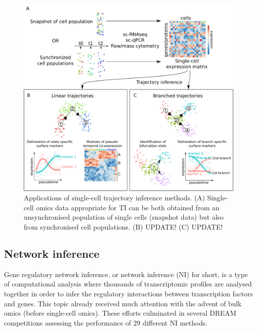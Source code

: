 \begin{figure}[htb!]
	\centering\includegraphics[width=\Largefigure]{fig/trajectory_inference_slim} %
	\caption{
		Applications of single-cell trajectory inference methods. (A) Single-cell omics data appropriate for TI can be both obtained from an unsynchronised population of single cells (snapshot data) but also from synchronised cell populations. (B) UPDATE! (C) UPDATE!
	}
	\label{fig:trajectory_inference}
\end{figure}


\subsection{Network inference}
Gene regulatory network inference, or network inference (NI) for short, is a type of computational analysis where thousands of transcriptomic profiles are analysed together in order to infer the regulatory interactions between transcription factors and genes. This topic already received much attention with the advent of bulk omics (before single-cell omics). These efforts culminated in several DREAM competitions assessing the performance of 29 different NI methods\cite{marbach_revealingstrengthsweaknesses_2010, marbach_wisdomcrowdsrobust_2012}. 

